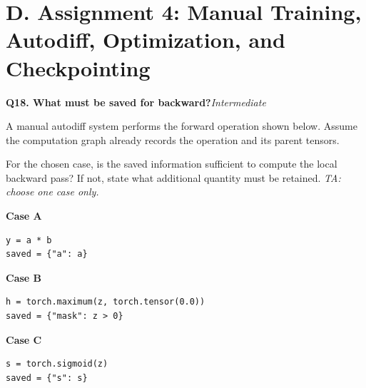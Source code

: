\documentclass[11pt]{article}
\newif\ifshowanswers
\newenvironment{question}[3]{%
  \par\medskip
  \noindent\textbf{Q#1. #2}\hfill\textit{#3}\par\smallskip
}{\par\medskip}
\newcommand{\answer}[1]{%
  \ifshowanswers
    \begin{quote}\small\textbf{Expected answer:} #1\end{quote}
  \fi
}
\newcommand{\marking}[1]{%
  \ifshowanswers
    \begin{quote}\small\textbf{1 mark:} #1\end{quote}
  \fi
}
\newcommand{\casesnote}{\textit{TA: choose one case only.}}
\begin{document}
\section*{D. Assignment 4: Manual Training, Autodiff, Optimization, and Checkpointing}

\begin{question}{18}{What must be saved for backward?}{Intermediate}
A manual autodiff system performs the forward operation shown below. Assume the
computation graph already records the operation and its parent tensors.

For the chosen case, is the saved information sufficient to compute the local
backward pass? If not, state what additional quantity must be retained.
\casesnote

\textbf{Case A}
\begin{verbatim}
y = a * b
saved = {"a": a}
\end{verbatim}

\textbf{Case B}
\begin{verbatim}
h = torch.maximum(z, torch.tensor(0.0))
saved = {"mask": z > 0}
\end{verbatim}

\textbf{Case C}
\begin{verbatim}
s = torch.sigmoid(z)
saved = {"s": s}
\end{verbatim}

\answer{
Case A: Not sufficient. To compute both local gradients,
$\partial y/\partial a=b$ and $\partial y/\partial b=a$, the backward operation
also needs \texttt{b} (or equivalent retained information).

Case B: Sufficient. The ReLU mask contains the information needed to multiply
the upstream gradient by $1$ where $z>0$ and $0$ elsewhere.

Case C: Sufficient. The sigmoid output is enough because its derivative can be
computed as $s(1-s)$.
}

\marking{Student correctly determines whether the saved information is
sufficient and, when necessary, identifies the missing quantity.}
\end{question}
\end{document}
